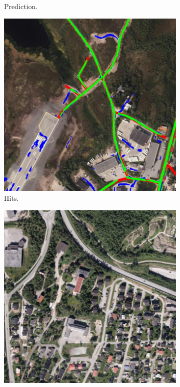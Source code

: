 \begin{figure}[H]
\begin{subfigure}{0.23\textwidth}
\caption{ Prediction. }
\vspace{0.2cm} %
\end{subfigure}
\hspace*{\fill} %
\begin{subfigure}{0.23\textwidth}
\includegraphics[width=\textwidth]{figs/appendix/hit1205.jpg}
\caption{ Hits. }
\vspace{0.2cm} %
\end{subfigure}
\begin{subfigure}{0.23\textwidth}
\includegraphics[width=\textwidth]{figs/appendix/img1217.jpg}

\end{subfigure}
\end{figure}
